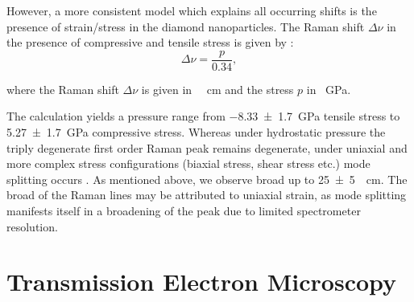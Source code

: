 % 
				However, a more consistent model which explains all occurring shifts is the presence of strain/stress in the diamond nanoparticles. The Raman shift $\Delta \nu$ in the presence of compressive and tensile stress is given by \cite{Widmann2016,Liscia2013a}: 
% 
				\begin{equation}
					\Delta \nu = \frac{p}{0.34},
				\end{equation}

				where the Raman shift $\Delta\nu$ is given in \SI{}{\per\centi\meter} and the stress $p$ in \SI{}{\giga\pascal}. 

				The calculation yields a pressure range from \SI[separate-uncertainty]{-8.33+-1.7}{\giga\pascal} tensile stress to \SI[separate-uncertainty]{5.27+-1.7}{\giga\pascal} compressive stress. Whereas under hydrostatic pressure the triply degenerate first order Raman peak remains degenerate, under uniaxial and more complex stress configurations (biaxial stress, shear stress etc.) mode splitting occurs \cite{Prawer2004}. As mentioned above, we observe broad \lws up to \SI[separate-uncertainty]{25+-5}{\per\centi\meter}.
				The broad \lws of the Raman lines may be attributed to uniaxial strain, as mode splitting manifests itself in a broadening of the peak due to limited spectrometer resolution.

		\section{Transmission Electron Microscopy}{\label{sec::tem}}

